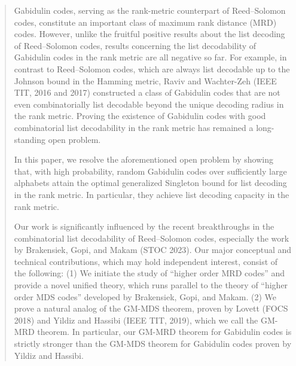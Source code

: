 \documentclass[11pt]{article}
\theoremstyle{plain}
\theoremstyle{definition}
\theoremstyle{remark}
\begin{document}
\begin{abstract}
Gabidulin codes, serving as the rank-metric counterpart of Reed--Solomon codes, constitute an important class of maximum rank distance (MRD) codes. However, unlike the fruitful positive results about the list decoding of Reed--Solomon codes, results concerning the list decodability of Gabidulin codes in the rank metric are all negative so far. For example, in contrast to Reed--Solomon codes, which are always list decodable up to the Johnson bound in the Hamming metric,
Raviv and Wachter-Zeh (IEEE TIT, 2016 and 2017) constructed a class of Gabidulin codes that are not even combinatorially list decodable beyond the unique decoding radius in the rank metric. Proving the existence of Gabidulin codes with good combinatorial list decodability in the rank metric has remained a long-standing open problem.

In this paper, we resolve the aforementioned open problem by showing that, with high probability, random Gabidulin codes over sufficiently large alphabets attain the optimal generalized Singleton bound for list decoding in the rank metric. In particular, they achieve list decoding capacity in the rank metric.

Our work is significantly influenced by the recent breakthroughs in the combinatorial list decodability of Reed--Solomon codes, especially the work by Brakensiek, Gopi, and Makam (STOC 2023). Our major conceptual and technical contributions, which may hold independent interest, consist of the following: (1) We initiate the study of ``higher order MRD codes'' and provide a novel unified theory, which runs parallel to the theory of ``higher order MDS codes'' developed by Brakensiek, Gopi, and Makam. (2) We prove a natural analog of the GM-MDS theorem, proven by Lovett (FOCS 2018) and Yildiz and Hassibi (IEEE TIT, 2019), which we call the GM-MRD theorem. In particular, our GM-MRD theorem for Gabidulin codes is strictly stronger than the GM-MDS theorem for Gabidulin codes proven by Yildiz and Hassibi.






\end{abstract}
\end{document}
